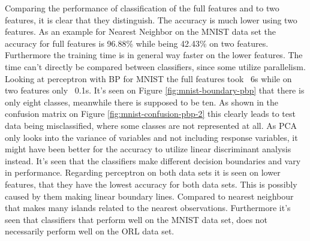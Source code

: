 Comparing the performance of classification of the full features and to two features, it is clear that they distinguish. The accuracy is much lower using two features. As an example for Nearest Neighbor on the MNIST data set the accuracy for full features is 96.88\% while being 42.43\% on two features. Furthermore the training time is in general way faster on the lower features. The time can't directly be compared between classifiers, since some utilize parallelism. Looking at perceptron with BP for MNIST the full features took ~6s while on two features only ~0.1s. It's seen on Figure \ref{fig:mnist-boundary-pbp} that there is only eight classes, meanwhile there is supposed to be ten. As shown in the confusion matrix on Figure \ref{fig:mnist-confusion-pbp-2} this clearly leads to test data being misclassified, where some classes are not represented at all. As PCA only looks into the variance of variables and not including response variables, it might have been better for the accuracy to utilize linear discriminant analysis instead. It's seen that the classifiers make different decision boundaries and vary in performance. Regarding perceptron on both data sets it is seen on lower features, that they have the lowest accuracy for both data sets. This is possibly caused by them making linear boundary lines. Compared to nearest neighbour that makes many islands related to the nearest observations. Furthermore it's seen that classifiers that perform well on the MNIST data set, does not necessarily perform well on the ORL data set. 